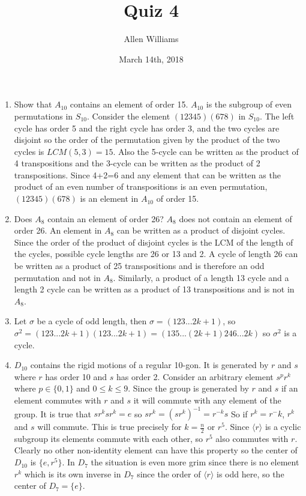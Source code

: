\documentclass{amsart}
\title{Quiz 4}
\author{Allen Williams }
\date{March 14th, 2018}
\begin{document}
\maketitle

\begin{enumerate}
    \item Show that $A_{10}$ contains an element of order 15.
    $A_{10}$ is the subgroup of even permutations in $S_{10}$.  Consider the element $(12345)(678)$ in $S_{10}$.  The left cycle has order 5 and the right cycle has order 3, and the two cycles are disjoint so the order of the permutation given by the product of the two cycles is $LCM(5,3)=15$.  Also the 5-cycle can be written as the product of 4 transpositions and the 3-cycle can be written as the product of 2 transpositions.  Since 4+2=6 and any element that can be written as the product of an even number of transpositions is an even permutation, $(12345)(678)$ is an element in $A_{10}$ of order 15.
    \item Does $A_8$ contain an element of order 26?
    $A_8$ does not contain an element of order 26.  An element in $A_8$ can be written as a product of disjoint cycles.  Since the order of the product of disjoint cycles is the LCM of the length of the cycles, possible cycle lengths are 26 or 13 and 2.  A cycle of length 26 can be written as a product of 25 transpositions and is therefore an odd permutation and not in $A_8$.  Similarly, a product of a length 13 cycle and a length 2 cycle can be written as a product of 13 transpositions and is not in $A_8$.
    \item Let $\sigma$ be a cycle of odd length, then $\sigma=(123...2k+1)$, so $\sigma^2=(123...2k+1)(123...2k+1)=(135...(2k+1)246...2k)$ so $\sigma^2$ is a cycle.
    \item $D_{10}$ contains the rigid motions of a regular 10-gon.  It is generated by $r$ and $s$ where $r$ has order 10 and $s$ has order 2.  Consider an arbitrary element $s^pr^k$ where $p\in\{0,1\}$ and $0\leq k\leq 9$.  Since the group is generated by $r$ and $s$ if an element commutes with $r$ and $s$ it will commute with any element of the group.  It is true that $sr^ksr^k=e$ so $sr^k=(sr^k)^{-1}=r^{-k}s$ So if $r^k=r^-k$, $r^k$ and $s$ will commute.  This is true precisely for $k=\frac{n}{2}$ or $r^5$.  Since $\langle r \rangle$ is a cyclic subgroup its elements commute with each other, so $r^5$ also commutes with $r$.  Clearly no other non-identity element can have this property so the center of $D_{10}$ is $\{e,r^5\}$.  In $D_7$ the situation is even more grim since there is no element $r^k$ which is its own inverse in $D_7$ since the order of $\langle r \rangle$ is odd here, so the center of $D_7=\{e\}$. 

\end{enumerate}
\end{document}
